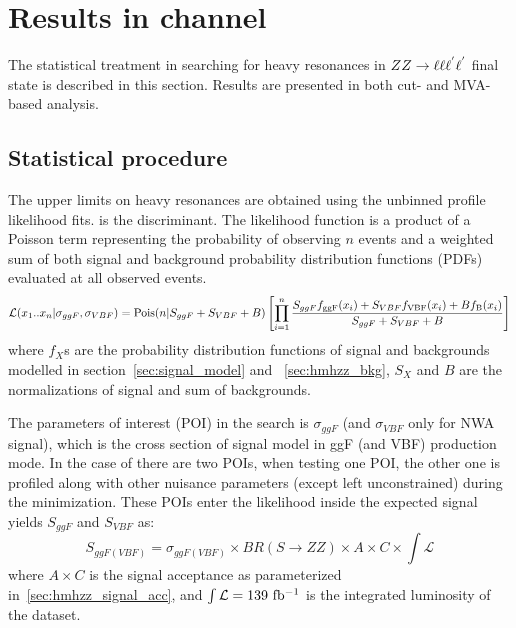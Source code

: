 \section{Results in \llll channel}
\label{sec:hmhzz_result_4l}

The statistical treatment in searching for heavy resonances in $ZZ \rightarrow \ell\ell\ell^{'}\ell^{'}$ final state is described in this section.
Results are presented in both cut- and MVA- based analysis.

\subsection{Statistical procedure}

The upper limits on heavy resonances are obtained using the unbinned profile likelihood fits.
\mfl is the discriminant.
The likelihood function is a product of a Poisson term representing the probability of observing $n$ events 
and a weighted sum of both signal and background probability distribution functions (PDFs) evaluated at all observed events.
\begingroup
\small
\begin{equation}
  {\cal L } (x_{1}..x_{n}| \sigma_{ggF}, \sigma_{VBF}) = \textrm{Pois}(n|S_{ggF} + S_{VBF} + B)  \left[ \prod\limits^{n}_{i=1}
  \frac{S_{ggF} f_{\textrm{ggF}}(x_{i}) + S_{VBF} f_{\textrm{VBF}}(x_{i}) + B f_{\textrm{B}}(x_{i})}{S_{ggF} + S_{VBF} + B}
  \right]
\end{equation}
\endgroup
where $f_X$s are the probability distribution functions of signal and backgrounds modelled in section~\ref{sec:signal_model} and ~\ref{sec:hmhzz_bkg}, 
$S_X$ and $B$ are the normalizations of signal and sum of backgrounds.

The parameters of interest (POI) in the search is $\sigma_{ggF}$ (and $\sigma_{VBF}$ only for NWA signal), which is the cross section of signal model in ggF (and VBF) production mode.
In the case of there are two POIs, when testing one POI, the other one is profiled along with other nuisance parameters (except left unconstrained) during the minimization. 
These POIs enter the likelihood inside the expected signal yields $S_{ggF}$ and $S_{VBF}$ as:
\begingroup
\small
\begin{equation}
S_{ggF(VBF)} = \sigma_{ggF(VBF)} \times BR(S\rightarrow ZZ) \times A \times C \times \int\mathcal{L}
\end{equation}
\endgroup
where $A\times C$ is the signal acceptance as parameterized in~\ref{sec:hmhzz_signal_acc}, and $\int\mathcal{L} = 139~\mbox{fb\(^{-1}\)} $ is the integrated luminosity of the dataset.

